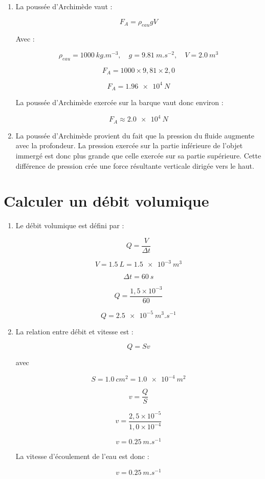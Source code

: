 \documentclass[a4paper,11pt,fleqn]{scrartcl}%
\begin{document}
\begin{enumerate}

\item La poussée d'Archimède vaut :

\[
F_A = \rho_{eau} g V
\]

Avec :

\[
\rho_{eau}= \SI{1000}{kg.m^{-3}}, \quad g=\SI{9,81}{m.s^{-2}}, \quad V=\SI{2,0}{m^3}
\]

\[
F_A = 1000 \times 9,81 \times 2,0
\]

\[
F_A = \SI{1,96e4}{N}
\]

La poussée d'Archimède exercée sur la barque vaut donc environ :

\[
F_A \approx \SI{2,0e4}{N}
\]

\item La poussée d'Archimède provient du fait que la pression du fluide augmente avec la profondeur.  
La pression exercée sur la partie inférieure de l'objet immergé est donc plus grande que celle exercée sur sa partie supérieure.  
Cette différence de pression crée une force résultante verticale dirigée vers le haut.
\end{enumerate}

\section{Calculer un débit volumique}

\begin{enumerate}

\item Le débit volumique est défini par :

\[
Q = \frac{V}{\Delta t}
\]

\[
V=\SI{1,5}{L}= \SI{1,5e-3}{m^3}
\]

\[
\Delta t = \SI{60}{s}
\]

\[
Q=\frac{1,5\times10^{-3}}{60}
\]

\[
Q=\SI{2,5e-5}{m^3.s^{-1}}
\]

\item La relation entre débit et vitesse est :

\[
Q = S v
\]

avec

\[
S = \SI{1,0}{cm^2} = \SI{1,0e-4}{m^2}
\]

\[
v = \frac{Q}{S}
\]

\[
v = \frac{2,5\times10^{-5}}{1,0\times10^{-4}}
\]

\[
v = \SI{0,25}{m.s^{-1}}
\]

La vitesse d'écoulement de l'eau est donc :

\[
v = \SI{0,25}{m.s^{-1}}
\]

\end{enumerate}
\end{document}
